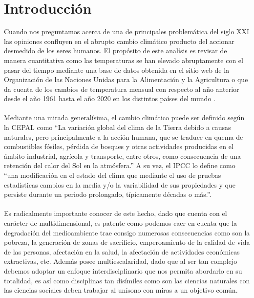 \documentclass[12pt]{article}
\begin{document}

\newpage
\thispagestyle{toc-style}
\tableofcontents
\listoffigures
\listoftables


\newpage
\clearpage
{}
\pagestyle{Content}
\section{Introducción}
Cuando nos preguntamos acerca de una de principales problemática del siglo XXI las opiniones confluyen en el abrupto cambio climático producto del accionar desmedido de los seres humanos. El propósito de este analísis es revisar de manera cuantitativa como las temperaturas se han elevado abruptamente con el pasar del tiempo mediante una base de datos obtenida en el sitio web de la Organización de las Naciones Unidas para la Alimentación y la Agricultura o \cite{fao_site} que da cuenta de los cambios de temperatura mensual con respecto al año anterior desde el año 1961 hasta el año 2020 en los distintos países del mundo .\\ \\
Mediante una mirada generalísima, el cambio climático puede ser definido según la CEPAL como “La variación global del clima de la Tierra debido a causas naturales, pero principalmente a la acción humana, que se traduce en quema de combustibles fósiles, pérdida de bosques y otras actividades producidas en el ámbito industrial, agrícola y transporte, entre otros, como consecuencia de una retención del calor del Sol en la atmósfera.” A su vez, el IPCC lo define como “una modificación en el estado del clima que mediante el uso de pruebas estadísticas cambios en la media y/o la variabilidad de sus propiedades y que persiste durante un periodo prolongado, típicamente décadas o más.”. \\ \\
Es radicalmente importante conocer de este hecho, dado que cuenta con el carácter de multidimensional, es patente como podemos caer en cuenta que la degradación del medioambiente trae consigo numerosas consecuencias como son la pobreza, la generación de zonas de sacrificio, emperoamiento de la calidad de vida de las personas, afectación en la salud, la afectación de actividades económicas extractivas, etc. Además posee multiescalaridad, dado que al ser tan complejo debemos adoptar un enfoque interdisciplinario que nos permita abordarlo en su totalidad, es así como disciplinas tan disímiles como son las ciencias naturales con las ciencias sociales deben trabajar al unísono con miras a un objetivo común.\\ \\
\end{document}
